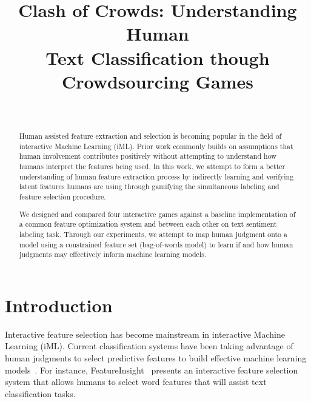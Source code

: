 \documentclass[chi_draft]{sigchi}
\def\plaintitle{Clash of Crowds: Understanding Human \\ Text Classification though Crowdsourcing Games}
\def\plainkeywords{Authors' choice; of terms; separated; by
  semicolons; include commas, within terms only; required.}
\begin{document}
\title{\plaintitle}

\author{%
  \\
}

\maketitle

\begin{abstract}
Human assisted feature extraction and selection is becoming popular in the field of interactive Machine Learning (iML). Prior work commonly builds on assumptions that human involvement contributes positively without attempting to understand how humans interpret the features being used. In this work, we attempt to form a better understanding of human feature extraction process by indirectly learning and verifying latent features humans are using through gamifying the simultaneous labeling and feature selection procedure.

We designed and compared four interactive games against a baseline implementation of a common feature optimization system and between each other on text sentiment labeling task. Through our experiments, we attempt to map human judgment onto a model using a constrained feature set (bag-of-words model) to learn if and how human judgments may effectively inform machine learning models.
\end{abstract}



\section{Introduction}

Interactive feature selection has become mainstream in interactive Machine Learning (iML).
Current classification systems have been taking advantage of human judgments to select predictive features to build effective machine learning models~\cite{brooks2015featureinsight, cheng2015flock}. 
For instance, FeatureInsight~\cite{brooks2015featureinsight} presents an interactive feature selection system that allows humans to select word features that will assist text classification tasks.
\end{document}
